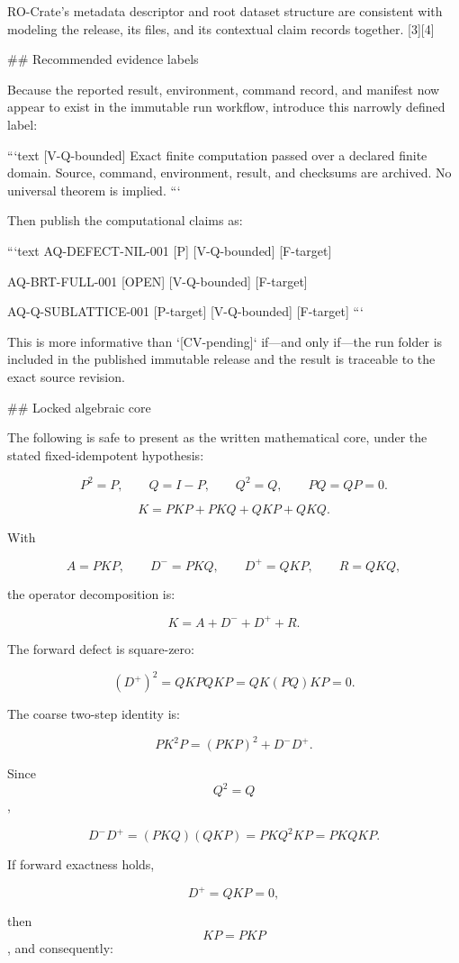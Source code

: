 RO-Crate’s metadata descriptor and root dataset structure are consistent with modeling the release, its files, and its contextual claim records together. [3][4]

## Recommended evidence labels

Because the reported result, environment, command record, and manifest now appear to exist in the immutable run workflow, introduce this narrowly defined label:

```text
[V-Q-bounded]
Exact finite computation passed over a declared finite domain.
Source, command, environment, result, and checksums are archived.
No universal theorem is implied.
```

Then publish the computational claims as:

```text
AQ-DEFECT-NIL-001
[P] [V-Q-bounded] [F-target]

AQ-BRT-FULL-001
[OPEN] [V-Q-bounded] [F-target]

AQ-Q-SUBLATTICE-001
[P-target] [V-Q-bounded] [F-target]
```

This is more informative than `[CV-pending]` if—and only if—the run folder is included in the published immutable release and the result is traceable to the exact source revision.

## Locked algebraic core

The following is safe to present as the written mathematical core, under the stated fixed-idempotent hypothesis:

$$
P^2=P,\qquad Q=I-P,\qquad Q^2=Q,\qquad PQ=QP=0.
$$

$$
K=PKP+PKQ+QKP+QKQ.
$$

With

$$
A=PKP,\qquad D^-=PKQ,\qquad D^+=QKP,\qquad R=QKQ,
$$

the operator decomposition is:

$$
K=A+D^-+D^++R.
$$

The forward defect is square-zero:

$$
(D^+)^2
=
QKPQKP
=
QK(PQ)KP
=
0.
$$

The coarse two-step identity is:

$$
\boxed{
PK^2P=(PKP)^2+D^-D^+.
}
$$

Since $$Q^2=Q$$,

$$
D^-D^+
=
(PKQ)(QKP)
=
PKQ^2KP
=
PKQKP.
$$

If forward exactness holds,

$$
D^+=QKP=0,
$$

then $$KP=PKP$$, and consequently:

